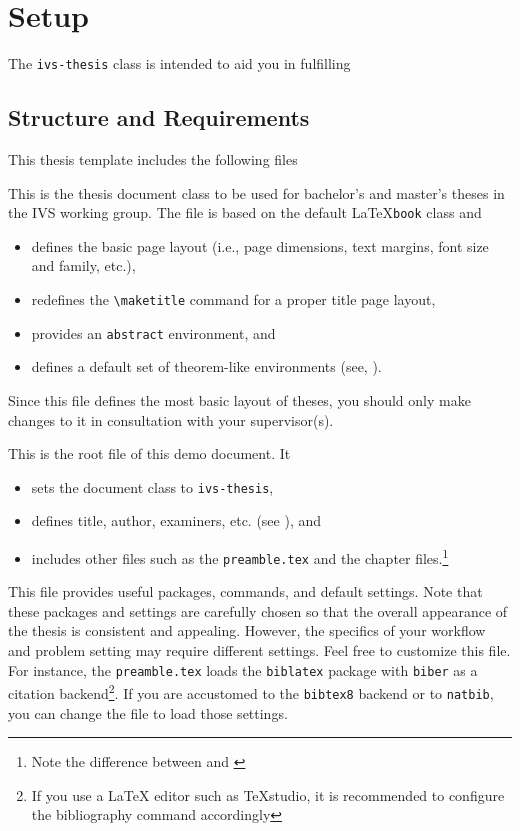 \chapter{Setup}

The \texttt{ivs-thesis} class is intended to aid you in fulfilling 

\section{Structure and Requirements} 

This thesis template includes the following files 

\begin{description}[font=\normalfont\ttfamily]
	\item[ivs-thesis.cls] This is the thesis document class to be used for 
	bachelor's and master's theses in the IVS working group. The file is based 
	on the default \LaTeX \texttt{book} class and  
	\begin{itemize}
		\item defines the basic page layout (i.e., page dimensions, text 
		margins, font size and family, etc.), 
		\item redefines the \verb|\maketitle| command for a 
		proper title page layout, 
		\item provides an \texttt{abstract} environment, and 
		\item defines a default set of theorem-like environments (see, ). 
	\end{itemize}
	Since this file defines the most basic layout of theses, you should only make changes to it in consultation with your supervisor(s). 
	\item[thesis.tex] This is the root file of this demo document. It 
	\begin{itemize}
		\item sets the document class to \texttt{ivs-thesis},
		\item defines title, author, examiners, etc. (see ), and 
		\item includes other files such as the \texttt{preamble.tex} and the chapter files.\VerbatimFootnotes\footnote{ Note the difference between \verb|| and \verb||}
	\end{itemize}
	\item[preamble.tex] This file provides useful packages, commands, and default settings. Note that these packages and settings are carefully chosen so that the overall appearance of the thesis is consistent and appealing. However, the specifics of your workflow and problem setting may require different settings. Feel free to customize this file. For instance, the \texttt{preamble.tex} loads the \texttt{biblatex} package with \texttt{biber} as a citation backend\footnote{If you use a \LaTeX{} editor such as TeXstudio, it is recommended to configure the bibliography command accordingly}. If you are accustomed to the \texttt{bibtex8} backend or to \texttt{natbib}, you can change the file to load those settings. 

\end{description}
